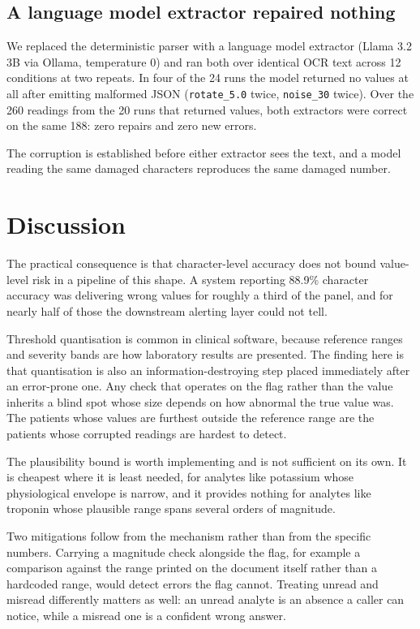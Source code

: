 \documentclass[11pt]{article}
\begin{document}
\subsection{A language model extractor repaired nothing}

We replaced the deterministic parser with a language model extractor (Llama 3.2 3B via Ollama,
temperature 0) and ran both over identical OCR text across 12 conditions at two repeats. In
four of the 24 runs the model returned no values at all after emitting malformed JSON
(\texttt{rotate\_5.0} twice, \texttt{noise\_30} twice). Over the 260 readings from the 20 runs
that returned values, both extractors were correct on the same 188: zero repairs and zero new
errors.

The corruption is established before either extractor sees the text, and a model reading the
same damaged characters reproduces the same damaged number.

\section{Discussion}

The practical consequence is that character-level accuracy does not bound value-level risk in a
pipeline of this shape. A system reporting 88.9\% character accuracy was delivering
wrong values for roughly a third of the panel, and for nearly half of those the downstream
alerting layer could not tell.

Threshold quantisation is common in clinical software, because reference ranges and severity
bands are how laboratory results are presented. The finding here is that quantisation is also an
information-destroying step placed immediately after an error-prone one. Any check that operates
on the flag rather than the value inherits a blind spot whose size depends on how abnormal the
true value was. The patients whose values are furthest outside the reference range are the
patients whose corrupted readings are hardest to detect.

The plausibility bound is worth implementing and is not sufficient on its own. It is cheapest
where it is least needed, for analytes like potassium whose physiological envelope is narrow,
and it provides nothing for analytes like troponin whose plausible range spans several orders of
magnitude.

Two mitigations follow from the mechanism rather than from the specific numbers. Carrying a
magnitude check alongside the flag, for example a comparison against the range printed on the
document itself rather than a hardcoded range, would detect errors the flag cannot. Treating
unread and misread differently matters as well: an unread analyte is an absence a caller can
notice, while a misread one is a confident wrong answer.
\end{document}
